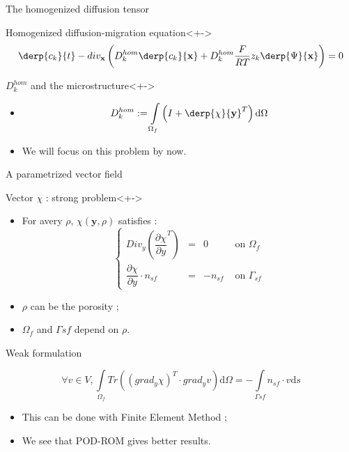 \begin{frame}{The homogenized diffusion tensor}
%
\begin{block}{Homogenized diffusion-migration equation}<+->
\[\derp{c_k}{t}-div_{\mathbf{x}}\left(D_k^{hom}\derp{c_k}{\mathbf{x}}+D_k^{hom}\frac{F}{RT}z_k \derp{\Psi}{\mathbf{x}}\right)=0\]
\end{block}
%
\begin{block}{$D_k^{hom}$ and the microstructure}<+->%
\begin{itemize}
\item<+-> \[D_k^{hom}:=\int\limits_{\Omega_f}\left(I+\derp{\chi}{\mathbf{y}}^T\right)\text{d}\Omega\]
\item<+-> We will focus on this problem by now.
\end{itemize}
\end{block}
%
\end{frame}

\begin{frame}{A parametrized vector field}
%
\begin{block}{Vector $\chi$ : strong problem}<+->
\begin{itemize}
\item<+-> For avery $\rho$, $\chi(\mathbf{y},\rho)$ satisfies :
\[%
\left\{%
\begin{array}{lccr}
Div_y \left( \dfrac{\partial{\chi}}{\partial{y}}^T\right) &=& 0&\text{ on }\Omega_f \\
\dfrac{\partial{\chi}}{\partial{y}} \cdot n_{sf}&=&-n_{sf}&\text{ on }\Gamma_{sf}
\end{array}
\right.
\]
\item<+-> %
$\rho$ can be the porosity ;
\item<+-> $\Omega_f$ and $\Gamma{sf}$ depend on $\rho$.
\end{itemize}
\end{block}
%
\end{frame}

\begin{frame}{Weak formulation}%
%
\begin{block}{}
\[%
\forall v \in V , %
\int\limits_{\Omega_f}Tr\left(\left(grad_y\chi\right)^T\cdot grad_y v\right)\text{d}\Omega=%
-\int\limits_{\Gamma{sf}}n_{sf}\cdot v\text{d}s%
\]
\end{block}

\pause
\begin{itemize}
\item<+-> This can be done with Finite Element Method ;
\item<+-> We see that POD-ROM gives better results.
\end{itemize}
%
\end{frame}
